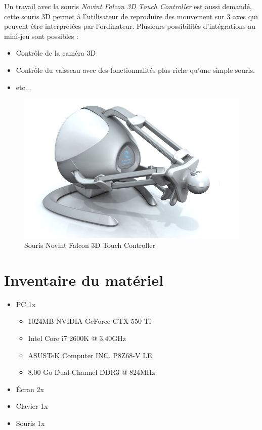 \documentclass[11pt, a4paper]{article}
\begin{document}
Un travail avec la souris \textit{Novint Falcon 3D Touch Controller} est aussi demandé, cette souris 3D permet à l'utilisateur de reproduire des mouvement sur 3 axes qui peuvent être interprétées par l'ordinateur.
Plusieurs possibilités d'intégrations au mini-jeu sont possibles :\\

\begin{itemize}
\item Contrôle de la caméra 3D
\item Contrôle du vaisseau avec des fonctionnalités plus riche qu'une simple souris.
\item etc...
\end{itemize}

\begin{figure}[H]
	\begin{center}
	\includegraphics[scale=.5]{falcon}
	\caption{Souris Novint Falcon 3D Touch Controller}
	\end{center}
\end{figure}
\section{Inventaire du matériel}
\begin{itemize}
\item PC 1x
	\begin{itemize}
	\item 1024MB NVIDIA GeForce GTX 550 Ti
	\item Intel Core i7 2600K @ 3.40GHz
	\item ASUSTeK Computer INC. P8Z68-V LE
	\item 8.00 Go Dual-Channel DDR3 @ 824MHz
	\end{itemize}
\item Écran 2x
\item Clavier 1x
\item Souris 1x
\end{itemize}
\end{document}
